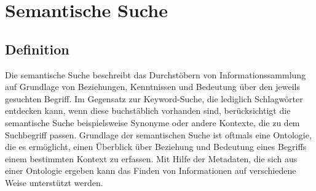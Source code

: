 \chapter{Semantische Suche}
\section{Definition}
Die semantische Suche beschreibt das Durchstöbern von Informationssammlung auf Grundlage von Beziehungen, Kenntnissen und Bedeutung über den jeweils gesuchten Begriff. Im Gegensatz zur Keyword-Suche, die lediglich Schlagwörter entdecken kann, wenn diese buchstäblich vorhanden sind, berücksichtigt die semantische Suche beispielsweise Synonyme oder andere Kontexte, die zu dem Suchbegriff passen.\newline
Grundlage der semantischen Suche ist oftmals eine Ontologie, die es ermöglicht, einen Überblick über Beziehung und Bedeutung eines Begriffs einem bestimmten Kontext zu erfassen. Mit Hilfe der Metadaten, die sich aus einer Ontologie ergeben kann das Finden von Informationen auf verschiedene Weise unterstützt werden.\newline

